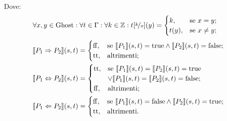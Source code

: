 Dove:
\begin{align*}
   \forall x,y\in\mathrm{Ghost}\mathrel{:}\forall t \in\Gamma\mathrel{:}\forall k\in\mathbb{Z} \mathrel{:} t[\nicefrac{k}{x}](y)
      &=
        \begin{cases}
                 k,   &\text{se $x = y$};\\
                 t(y),&\text{se $x  \neq  y$};
        \end{cases}
\end{align*}
\begin{align*}
    \llbracket P_1 \Rightarrow P_2 \rrbracket(s,t)
       &=
        \begin{cases}
            \mathrm{ff}, &\text{se $\llbracket P_1\rrbracket(s,t) = \mathrm{true} \land \llbracket P_2\rrbracket(s,t) = \mathrm{false}$};\\
            \mathrm{tt}, &\text{altrimenti};
        \end{cases}\\
    \llbracket P_1 \Leftrightarrow P_2\rrbracket(s,t)
       &=
        \begin{cases}
            \mathrm{tt},&\text{se $\llbracket P_1\rrbracket(s,t) = \llbracket P_2\rrbracket(s,t) = \mathrm{true}$}\\
                 &\text{$\lor\llbracket P_1\rrbracket(s,t) = \llbracket P_2 \rrbracket(s,t) = \mathrm{false}$};\\
            \mathrm{ff}, &\text{altrimenti};
        \end{cases}\\
   \llbracket P_1 \Leftarrow P_2\rrbracket(s,t)
      &=
        \begin{cases}
            \mathrm{ff},&\text{se $\llbracket P_1\rrbracket(s,t) = \mathrm{false} \land \llbracket P_2\rrbracket(s,t) = \mathrm{true}$};\\
            \mathrm{tt},&\text{altrimenti}.
   \end{cases}
\end{align*}
